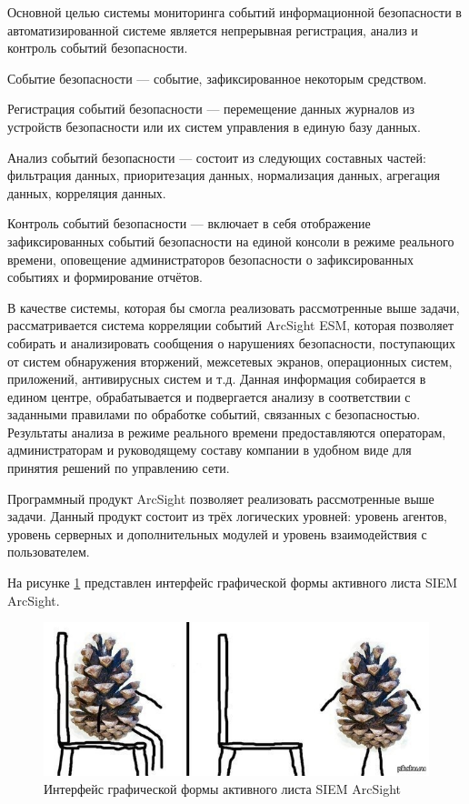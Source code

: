 Основной целью системы мониторинга событий информационной безопасности в автоматизированной системе является непрерывная регистрация, анализ и контроль событий безопасности.

Событие безопасности --- событие, зафиксированное некоторым средством.

Регистрация событий безопасности --- перемещение данных журналов из устройств безопасности или их систем управления в единую базу данных.

Анализ событий безопасности --- состоит из следующих составных частей: фильтрация данных, приоритезация данных, нормализация данных, агрегация данных, корреляция данных.

Контроль событий безопасности --- включает в себя отображение зафиксированных событий безопасности на единой консоли в режиме реального времени, оповещение администраторов безопасности о зафиксированных событиях и формирование отчётов.

В качестве системы, которая бы смогла реализовать рассмотренные выше задачи, рассматривается система корреляции событий ArcSight ESM, которая позволяет собирать и анализировать сообщения о нарушениях безопасности, поступающих от систем обнаружения вторжений, межсетевых экранов, операционных систем, приложений, антивирусных систем и т.д. Данная информация собирается в едином центре, обрабатывается и подвергается анализу в соответствии с заданными правилами по обработке событий, связанных с безопасностью. Результаты анализа в режиме реального времени предоставляются операторам, администраторам и руководящему составу компании в удобном виде для принятия решений по управлению сети.

Программный продукт ArcSight позволяет реализовать рассмотренные выше задачи. Данный продукт состоит из трёх логических уровней: уровень агентов, уровень серверных и дополнительных модулей и уровень взаимодействия с пользователем.

На рисунке \ref{ArcSight4} представлен интерфейс графической формы активного листа SIEM ArcSight. 

\begin{figure}[H]
  \centering
  \includegraphics[width=1\textwidth]{image/12.jpg}
  \caption{Интерфейс графической формы активного листа SIEM ArcSight}
  \label{ArcSight4}
\end{figure}

